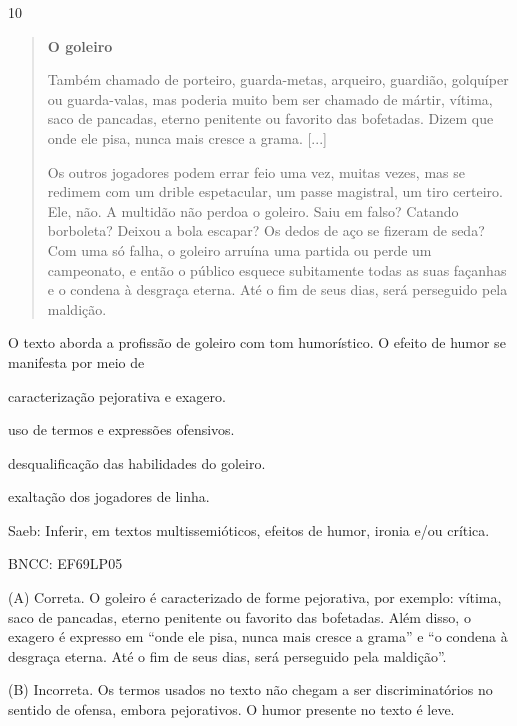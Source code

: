 \num{10}

\begin{quote}
\textbf{O goleiro}

Também chamado de porteiro, guarda-metas, arqueiro, guardião, golquíper
ou guarda-valas, mas poderia muito bem ser chamado de mártir, vítima,
saco de pancadas, eterno penitente ou favorito das bofetadas. Dizem que
onde ele pisa, nunca mais cresce a grama. {[}...{]}

Os outros jogadores podem errar feio uma vez, muitas vezes, mas se
redimem com um drible espetacular, um passe magistral, um tiro certeiro.
Ele, não. A multidão não perdoa o goleiro. Saiu em falso? Catando
borboleta? Deixou a bola escapar? Os dedos de aço se fizeram de seda?
Com uma só falha, o goleiro arruína uma partida ou perde um campeonato,
e então o público esquece subitamente todas as suas façanhas e o condena
à desgraça eterna. Até o fim de seus dias, será perseguido pela
maldição.
\end{quote}


O texto aborda a profissão de goleiro com tom humorístico. O efeito de
humor se manifesta por meio de

\begin{escolha}
\item caracterização pejorativa e exagero.

\item uso de termos e expressões ofensivos.

\item desqualificação das habilidades do goleiro.

\item exaltação dos jogadores de linha.
\end{escolha}

Saeb: Inferir, em textos multissemióticos, efeitos de humor, ironia e/ou
crítica.

BNCC: EF69LP05

(A) Correta. O goleiro é caracterizado de forme pejorativa, por exemplo:
vítima, saco de pancadas, eterno penitente ou favorito das bofetadas.
Além disso, o exagero é expresso em ``onde ele pisa, nunca mais cresce a
grama'' e ``o condena à desgraça eterna. Até o fim de seus dias, será
perseguido pela maldição''.

(B) Incorreta. Os termos usados no texto não chegam a ser
discriminatórios no sentido de ofensa, embora pejorativos. O humor
presente no texto é leve.

